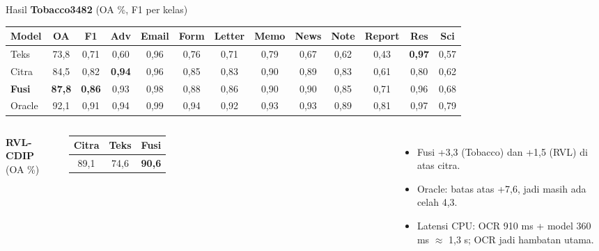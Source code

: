 \documentclass[aspectratio=169,10pt]{beamer}
\newcommand\kecil{\fontsize{8}{9.5}\selectfont}
\begin{document}
\begin{frame}{Hasil}
  \kecil
  \textbf{Tobacco3482} (OA \%, F1 per kelas)\\[2pt]
  \setlength\tabcolsep{3pt}
  \begin{tabular}{lcccccccccccc}
    \toprule
    Model & OA & F1 & Adv & Email & Form & Letter & Memo & News & Note & Report & Res & Sci \\ \midrule
    Teks & 73,8 & 0,71 & 0,60 & 0,96 & 0,76 & 0,71 & 0,79 & 0,67 & 0,62 & 0,43 & \textbf{0,97} & 0,57 \\
    Citra & 84,5 & 0,82 & \textbf{0,94} & 0,96 & 0,85 & 0,83 & 0,90 & 0,89 & 0,83 & 0,61 & 0,80 & 0,62 \\
    \textbf{Fusi} & \textbf{87,8} & \textbf{0,86} & 0,93 & 0,98 & 0,88 & 0,86 & 0,90 & 0,90 & 0,85 & 0,71 & 0,96 & 0,68 \\
    Oracle & 92,1 & 0,91 & 0,94 & 0,99 & 0,94 & 0,92 & 0,93 & 0,93 & 0,89 & 0,81 & 0,97 & 0,79 \\ \bottomrule
  \end{tabular}

  \vspace{8pt}
  \begin{columns}[T]
    \textbf{RVL-CDIP} (OA \%)\\[2pt]
    \begin{tabular}{ccc}
      \toprule Citra & Teks & Fusi \\ \midrule 89,1 & 74,6 & \textbf{90,6} \\ \bottomrule
    \end{tabular}
    \begin{itemize}
      \item Fusi +3,3 (Tobacco) dan +1,5 (RVL) di atas citra.
      \item Oracle: batas atas +7,6, jadi masih ada celah 4,3.
      \item Latensi CPU: OCR 910 ms + model 360 ms $\approx$ 1,3 s; OCR jadi hambatan utama.
    \end{itemize}
  \end{columns}
\end{frame}
\end{document}
